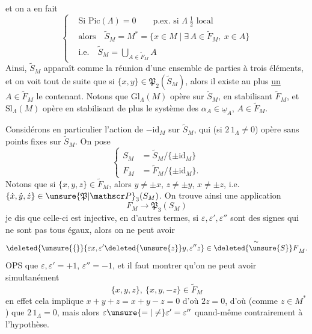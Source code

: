 et on a en fait
\[
\left\{\begin{aligned}
&\text{Si }\mathrm{Pic}(\Lambda)=0\qquad\text{p.ex. si }\Lambda\ \tfrac12\text{ local}\\
&\text{alors}\quad\widetilde S_M=M^*=\{x\in M\mid\exists\, A\in\widetilde F_M,\ x\in A\}\\
&\text{i.e.}\quad\widetilde S_M=\bigcup_{A\in\widetilde F_M} A
\end{aligned}\right.\tag*{(17)}
\]
Ainsi, $\widetilde S_M$ apparaît comme la réunion d'une ensemble  de parties à trois éléments, et on voit tout de suite que si $\{x,y\}\in\mathfrak P_2(\widetilde S_M)$, alors il existe au plus \uline{un} $A\in\widetilde F_M$ le contenant.
Notons que $\mathrm{Gl}_{\Lambda}(M)$ opère sur $\widetilde S_M$, en stabilisant $\widetilde F_M$, et $\mathrm{Sl}_{\Lambda}(M)$ opère en stabilisant de plus le système des $\alpha_A\in\underline{\omega}_A$, $A\in\widetilde F_M$.


Considérons en particulier l'action de  $-\mathrm{id}_M$ sur $\widetilde S_M$, qui (si $2\,1_{\Lambda}\ne0$) opère sans points fixes sur $\widetilde S_M$. On pose
\[
\left\{\begin{aligned}
S_M&=\widetilde S_M/\{\pm\mathrm{id}_M\}\\
F_M&=\widetilde F_M/\{\pm\mathrm{id}_M\}.
\end{aligned}\right.\tag*{(18)}
\]
Notons que si $\{x,y,z\}\in\widetilde F_M$, alors $y\ne\pm x$, $z\ne\pm y$, $x\ne\pm z$, i.e. $\{\dot x,\dot y,\dot z\}\in\unsure{\mathfrak P|\mathscr P}_3(S_M)$. On trouve ainsi une application
\[
F_M\longrightarrow\mathfrak P_3(S_M)
\]
je dis que celle-ci est injective, en d'autres termes,  si $\varepsilon,\varepsilon',\varepsilon''$   sont des signes qui ne sont pas tous égaux, alors on ne peut avoir
\[
\deleted{\unsure{\{}}\{\varepsilon x,\varepsilon'\deleted{\unsure{z}}y,\varepsilon''z\}\in\overset{\sim}{\deleted{\unsure{S}}F}_M.
\]
OPS que $\varepsilon,\varepsilon'=+1$, $\varepsilon''=-1$, et il faut montrer
qu'on ne peut avoir simultanément
\[
\{x,y,z\},\ \{x,y,-z\}\in\widetilde F_M
\]
en effet cela implique $x+y+z=x+y-z=0$ d'où $2z=0$, d'où (comme $z\in M^*$) que $2\,1_\Lambda=0$, mais alors $\varepsilon\unsure{=|\ne}\varepsilon'=\varepsilon''$ quand-même contrairement à l'hypothèse.


